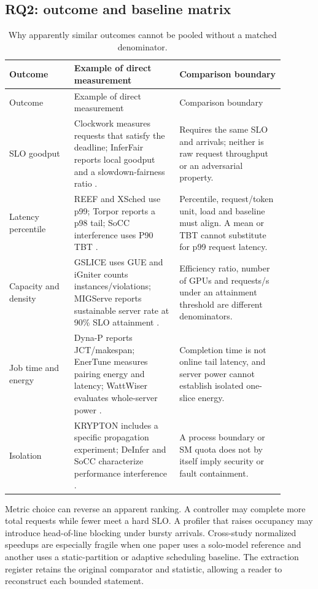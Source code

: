 \subsection{RQ2: outcome and baseline matrix}
\begin{longtable}{P{0.21\linewidth}P{0.34\linewidth}P{0.34\linewidth}}
\caption{Why apparently similar outcomes cannot be pooled without a matched denominator.}\\
\toprule Outcome & Example of direct measurement & Comparison boundary\\\midrule\endfirsthead
\toprule Outcome & Example of direct measurement & Comparison boundary\\\midrule\endhead
SLO goodput & Clockwork measures requests that satisfy the deadline; InferFair reports local goodput and a slowdown-fairness ratio \cite{clockwork,inferfair}. & Requires the same SLO and arrivals; neither is raw request throughput or an adversarial property.\\
Latency percentile & REEF and XSched use p99; Torpor reports a p98 tail; SoCC interference uses P90 TBT \cite{reef,xsched,torpor,interference_deeper}. & Percentile, request/token unit, load and baseline must align. A mean or TBT cannot substitute for p99 request latency.\\
Capacity and density & GSLICE uses GUE and iGniter counts instances/violations; MIGServe reports sustainable server rate at 90\% SLO attainment \cite{gslice,igniter,migserve}. & Efficiency ratio, number of GPUs and requests/s under an attainment threshold are different denominators.\\
Job time and energy & Dyna-P reports JCT/makespan; EnerTune measures pairing energy and latency; WattWiser evaluates whole-server power \cite{dynap,enertune,wattwiser}. & Completion time is not online tail latency, and server power cannot establish isolated one-slice energy.\\
Isolation & KRYPTON includes a specific propagation experiment; DeInfer and SoCC characterize performance interference \cite{krypton,deinfer,interference_deeper}. & A process boundary or SM quota does not by itself imply security or fault containment.\\
\bottomrule\end{longtable}

Metric choice can reverse an apparent ranking. A controller may complete more total requests while fewer meet a hard SLO. A profiler that raises occupancy may introduce head-of-line blocking under bursty arrivals. Cross-study normalized speedups are especially fragile when one paper uses a solo-model reference and another uses a static-partition or adaptive scheduling baseline. The extraction register retains the original comparator and statistic, allowing a reader to reconstruct each bounded statement.

